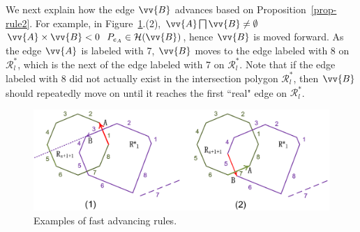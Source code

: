 We next explain how the edge $\vv{B}$ advances based on Proposition~\ref{prop-rule2}.
For example, in Figure~\ref{fig:r-poly-rule1}.(2), $\vv{A} \bigsqcap \vv{B} \ne \emptyset$ \And $\vv{A} \times \vv{B} < 0$ \And $P_{e_A} \in \mathcal{H}(\vv{B})$, hence $\vv{B}$ is moved forward. As the edge $\vv{A}$ is labeled with 7,
$\vv{B}$ moves to the edge labeled with 8 on $\mathcal{R}^*_{l}$, which is the next of the edge labeled with 7 on $\mathcal{R}^*_{l}$.
Note that if the edge labeled with 8 did not actually exist in the intersection polygon $\mathcal{R}^*_{l}$, then $\vv{B}$ should repeatedly move on until it reaches the first ``real" edge on $\mathcal{R}^*_{l}$.




\begin{figure}[tb!]
	\centering
	\includegraphics[scale=0.82]{figures/Fig-r-poly-rule1.png}
	\vspace{-1ex}
	\caption{\small Examples of fast advancing rules.}
	\vspace{-1ex}
	\label{fig:r-poly-rule1}
\end{figure}





